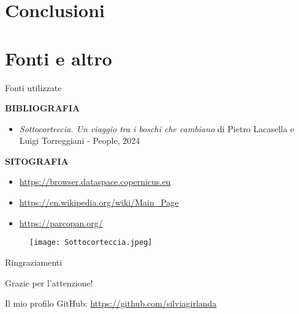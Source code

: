 \documentclass{beamer} %
\begin{document}
\section{Conclusioni}

\section{Fonti e altro}

 \begin{frame}{Fonti utilizzate}
 \begin{multicols}{2}
 \textbf{BIBLIOGRAFIA}
 \begin{itemize}
     \item \textit{Sottocorteccia. Un viaggio tra i boschi che cambiano} di 
Pietro Lacasella e Luigi Torreggiani - People, 2024
 \end{itemize}
\bigskip
 \textbf{SITOGRAFIA}
            \begin{itemize}
                \item \url{https://browser.dataspace.copernicus.eu} \\
                \item \url{https://en.wikipedia.org/wiki/Main_Page} \\
                \item \url{https://parcopan.org/} \\
            \end{itemize}  
\columnbreak
\begin{figure}
    \centering
    \texttt{[image: Sottocorteccia.jpeg]}
\end{figure}
\end{multicols}
        \end{frame}
        
\begin{frame}{Ringraziamenti}
            \begin{center}
                {\huge Grazie per l'attenzione!}\\
                \bigskip
                \bigskip
                \bigskip
                \bigskip
                \bigskip
                \bigskip
                \bigskip
                \bigskip
            \end{center}
        Il mio profilo GitHub: \url{https://github.com/silviagirlanda} \end{frame}
\end{document}

